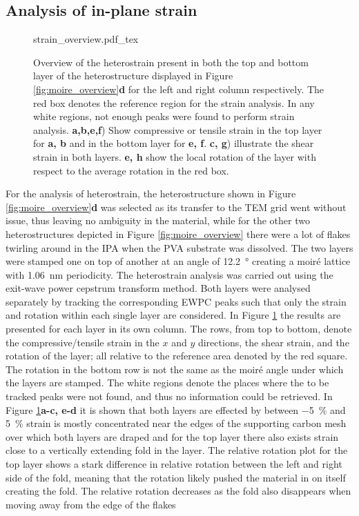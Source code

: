 \subsection{Analysis of in-plane strain}
\begin{figure}
    \centering
    \def\svgwidth{.74\linewidth}
    {strain_overview.pdf_tex}
    \caption{Overview of the heterostrain present in both the top and bottom layer of the heterostructure displayed in Figure \ref{fig:moire_overview}\textbf{d} for the left and right column respectively. The red box denotes the reference region for the strain analysis. In any white regions, not enough peaks were found to perform strain analysis. \textbf{a,b,e,f}) Show compressive or tensile strain in the top layer for \textbf{a, b} and in the bottom layer for \textbf{e, f}. \textbf{c, g}) illustrate the shear strain in both layers. \textbf{e, h} show the local rotation of the layer with respect to the average rotation in the red box.}
    \label{fig:strain_overview}
\end{figure}

For the analysis of heterostrain, the heterostructure shown in Figure \ref{fig:moire_overview}\textbf{d} was selected as its transfer to the TEM grid went without issue, thus leaving no ambiguity in the material, while for the other two heterostructures depicted in Figure \ref{fig:moire_overview} there were a lot of flakes twirling around in the IPA when the PVA substrate was dissolved. The two layers were stamped one on top of another at an angle of \SI{12.2}{\degree} creating a moiré lattice with \SI{1.06}{\nano\meter} periodicity.
The heterostrain analysis was carried out using the exit-wave power cepstrum transform method. Both layers were analysed separately by tracking the corresponding EWPC peaks such that only the strain and rotation within each single layer are considered. In Figure \ref{fig:strain_overview} the results are presented for each layer in its own column. The rows, from top to bottom, denote the compressive/tensile strain in the $x$ and $y$ directions, the shear strain, and the rotation of the layer; all relative to the reference area denoted by the red square. The rotation in the bottom row is not the same as the moiré angle under which the layers are stamped. The white regions denote the places where the to be tracked peaks were not found, and thus no information could be retrieved.
In Figure \ref{fig:strain_overview}\textbf{a-c, e-d} it is shown that both layers are effected by between \SI{-5}{\percent} and \SI{5}{\percent} strain is mostly concentrated near the edges of the supporting carbon mesh over which both layers are draped and for the top layer there also exists strain close to a vertically extending fold in the layer. The relative rotation plot for the top layer shows a stark difference in relative rotation between the left and right side of the fold, meaning that the rotation likely pushed the material in on itself creating the fold. The relative rotation decreases as the fold also disappears when moving away from the edge of the flakes
\newpage


